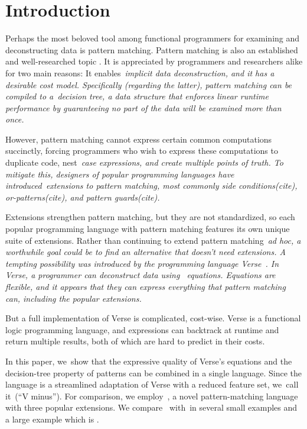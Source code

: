 \documentclass[article,screen,12pt, nonacm]{acmart}
\begin{document}
\section{Introduction}

Perhaps the most beloved tool among functional programmers for examining and
deconstructing data is pattern matching. 
Pattern matching is also an established and well-researched topic
\citep{wadler1987views, macqueen1985tree, burton1993pattern, palao1996new,
maranget, bpc}. It is appreciated by programmers and researchers alike for two
main reasons: It enables~\it{implicit} data deconstruction, and it has a
desirable cost model. Specifically (regarding the latter), pattern matching can
be compiled to a~\it{decision tree}, a data structure that enforces linear
runtime performance by guaranteeing no part of the data will be examined more
than once.~\citep{maranget}

However, pattern matching cannot express certain common computations succinctly,
forcing programmers who wish to express these computations to duplicate code,
nest~\it{case} expressions, and create multiple points of truth. To mitigate
this, designers of popular programming languages have introduced~\it{extensions}
to pattern matching, most commonly \textit{side conditions}(cite),
\textit{or-patterns}(cite), and \textit{pattern guards}(cite).

Extensions strengthen pattern matching, but they are not standardized, so each
popular programming language with pattern matching features its own unique suite
of extensions. Rather than continuing to extend pattern matching~\it{ad hoc}, a
worthwhile goal could be to find an alternative that doesn't need extensions. A
tempting possibility was introduced by the programming language
Verse~\citep{verse}. In Verse, a programmer can deconstruct data using
~\it{equations}. Equations are flexible, and it appears that they can express
everything that pattern matching can, including the popular extensions. 

But a full implementation of Verse is complicated, cost-wise. Verse is a
functional logic programming language, and expressions can backtrack at runtime
and return multiple results, both of which are hard to predict in their costs. 


In this paper, we~show that the expressive quality of Verse's equations and the
decision-tree property of patterns can be combined in a single language. Since
the language is a streamlined adaptation of Verse with a reduced feature set,
we~call it~\VMinus (“V minus”). For comparison, we employ~\PPlus, a novel
pattern-matching language with three popular extensions. We compare~\VMinus
with~\PPlus in several small examples and a large example which is \padlexample. 
\end{document}
